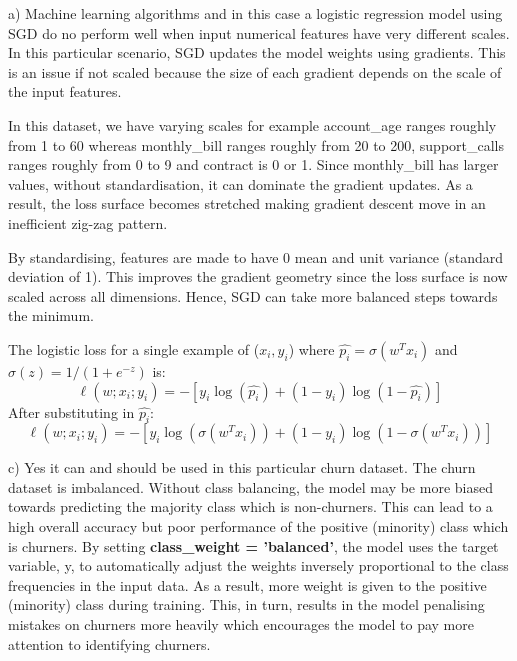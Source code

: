 \begin{partquestion2}{a)} Machine learning algorithms and in this case a logistic regression model using SGD do no 
perform well when input numerical features have very different scales. In this particular
scenario, SGD updates the model weights using gradients. This is an issue if not scaled because
the size of each gradient depends on the scale of the input features. 

In this dataset, we have varying scales for example account\_age ranges roughly from 1 to 60 
whereas monthly\_bill ranges roughly from 20 to 200, support\_calls ranges roughly from 0 to 9
and contract is 0 or 1. Since monthly\_bill has larger values, without standardisation, it can 
dominate the gradient updates. As a result, the loss surface becomes stretched making 
gradient descent move in an inefficient zig-zag pattern. 

By standardising, features are made to have 0 mean and unit variance (standard deviation of 1). 
This improves the gradient geometry since the loss surface is now scaled across all dimensions.
Hence, SGD can take more balanced steps towards the minimum.
\end{partquestion2}

 The logistic loss for a single example of ($x_i,y_i$) where $\hat{p_i} = \sigma(w^Tx_i)$ and
$\sigma(z) = 1/(1+e^{-z})$ is:
\[\ell(w;x_i;y_i) = - [y_i \log(\hat{p_i}) + (1 - y_i) \log(1 - \hat{p_i})]\]
After substituting in $\hat{p_i}$:
\[\ell(w;x_i;y_i) = - [y_i \log(\sigma(w^Tx_i)) + (1 - y_i) \log(1 - \sigma(w^Tx_i))]\]

\begin{partquestion2}{c)} Yes it can and should be used in this particular churn dataset. The churn dataset is
imbalanced. Without class balancing, the model may be more biased towards predicting
the majority class which is non-churners. This can lead to a high overall accuracy but 
poor performance of the positive (minority) class which is churners.
\newpage
By setting \textbf{class\_weight = 'balanced'}, the model uses the 
target variable, y, to automatically adjust the weights inversely proportional to the
class frequencies in the input data. As a result, more weight is given to the positive
(minority) class during training. This, in turn, results in the model penalising mistakes
on churners more heavily which encourages the model to pay more attention to identifying churners.
\end{partquestion2}
